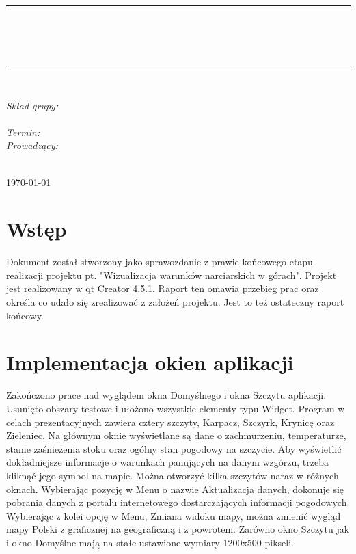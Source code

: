\documentclass[10pt, a4paper]{article}
\begin{document}
\def\tablename{Tabela}	

\begin{titlepage}
	\begin{center}
		\textsc{\LARGE \formakursu}\\[1cm]		
		\textsc{\Large \kurs}\\[0.5cm]		
		\rule{\textwidth}{0.08cm}\\[0.4cm]
		{\huge \bfseries \doctype}\\[1cm]
		{\huge \bfseries \projectname}\\[0.5cm]
	
		\rule{\textwidth}{0.08cm}\\[1cm]
		
		\begin{flushright} \large
		\emph{Skład grupy:}\\
		\osobaA\\

		
		\emph{Termin: }\termin\\[0.4cm]

		\emph{Prowadzący:} \\
		\prowadzacy \\
		
		\end{flushright}
		
		\vfill
		
		{\large \today}
	\end{center}	
\end{titlepage}

\newpage
\tableofcontents
\newpage

\section{Wstęp}
\label{sec:OpisProjektu}
Dokument został stworzony jako sprawozdanie z prawie końcowego etapu realizacji projektu pt. "Wizualizacja warunków narciarskich w górach". Projekt jest realizowany w qt Creator 4.5.1. Raport ten omawia przebieg prac oraz określa co udało się zrealizować z założeń projektu. Jest to też ostateczny raport końcowy.

\section{Implementacja okien aplikacji} 
Zakończono prace nad wyglądem okna Domyślnego i okna Szczytu aplikacji. Usunięto obszary testowe i ułożono wszystkie elementy typu Widget. Program w celach prezentacyjnych zawiera cztery szczyty, Karpacz, Szczyrk, Krynicę oraz Zieleniec. Na głównym oknie wyświetlane są dane o zachmurzeniu, temperaturze, stanie zaśnieżenia stoku oraz ogólny stan pogodowy na szczycie. Aby wyświetlić dokładniejsze informacje o warunkach panujących na danym wzgórzu, trzeba kliknąć jego symbol na mapie. Można otworzyć kilka szczytów naraz w różnych oknach. Wybierając pozycję w Menu o nazwie Aktualizacja danych, dokonuje się pobrania danych z portalu internetowego dostarczających informacji pogodowych. Wybierając z kolei opcję w Menu, Zmiana widoku mapy, można zmienić wygląd mapy Polski z graficznej na geograficzną i z powrotem. Zarówno okno Szczytu jak i okno Domyślne mają na stałe ustawione wymiary 1200x500 pikseli. 
\end{document}

